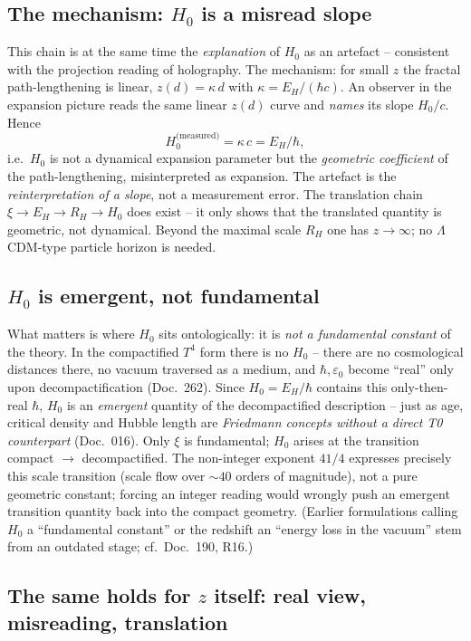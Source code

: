 \subsection*{The mechanism: $H_0$ is a misread slope}

This chain is at the same time the \emph{explanation} of $H_0$ as an artefact
-- consistent with the projection reading of holography. The mechanism: for
small $z$ the fractal path-lengthening is linear, $z(d) = \kappa\,d$ with
$\kappa = E_H/(\hbar c)$. An observer in the expansion picture reads the same
linear $z(d)$ curve and \emph{names} its slope $H_0/c$. Hence
\[
  H_0^{\text{(measured)}} = \kappa\,c = E_H/\hbar,
\]
i.e.\ $H_0$ is not a dynamical expansion parameter but the \emph{geometric
coefficient} of the path-lengthening, misinterpreted as expansion. The
artefact is the \emph{reinterpretation of a slope}, not a measurement error.
The translation chain $\xi \to E_H \to R_H \to H_0$ does exist -- it only
shows that the translated quantity is geometric, not dynamical. Beyond the
maximal scale $R_H$ one has $z\to\infty$; no $\Lambda$CDM-type particle
horizon is needed.

\subsection*{$H_0$ is emergent, not fundamental}

What matters is where $H_0$ sits ontologically: it is \emph{not a fundamental
constant} of the theory. In the compactified $T^4$ form there is no $H_0$ --
there are no cosmological distances there, no vacuum traversed as a medium, and
$\hbar, \varepsilon_0$ become \enquote{real} only upon decompactification
(Doc.~262). Since $H_0 = E_H/\hbar$ contains this only-then-real $\hbar$, $H_0$
is an \emph{emergent} quantity of the decompactified description -- just as
age, critical density and Hubble length are \emph{Friedmann concepts without a
direct T0 counterpart} (Doc.~016). Only $\xi$ is fundamental; $H_0$ arises at
the transition compact $\to$ decompactified. The non-integer exponent $41/4$
expresses precisely this scale transition (scale flow over $\sim 40$ orders of
magnitude), not a pure geometric constant; forcing an integer reading would
wrongly push an emergent transition quantity back into the compact geometry.
(Earlier formulations calling $H_0$ a \enquote{fundamental constant} or the
redshift an \enquote{energy loss in the vacuum} stem from an outdated stage;
cf.\ Doc.~190, R16.)

\subsection*{The same holds for $z$ itself: real view, misreading, translation}

